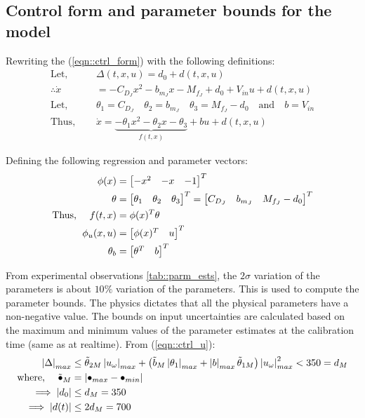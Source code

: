 \subsection{Control form and parameter bounds for the model}

Rewriting the (\ref{eqn::ctrl_form}) with the following definitions:
\begin{align}
    \text{Let, }\quad &\Delta(t, x, u) = d_0 + d(t, x, u) \\
    \therefore \dot x &= -C_{D_J} x^2 -b_{m_J} x - M_{f_J} + d_0 + V_{in} u + d(t, x, u) \\
    \text{Let, } \quad & \theta_1 = C_{D_J} \quad \theta_2 = b_{m_J} \quad \theta_3 = M_{f_J} - d_0  \quad \text{and} \quad b = V_{in}\\
    \text{Thus, }\quad & \dot x = \underbrace{-\theta_1 x^2 -\theta_2 x - \theta_3}_{f(t, x)} + b u + d(t, x, u)
    \label{eqn::prm_ctrl_form}
\end{align}

Defining the following regression and parameter vectors:
\begin{align}
    \phi(x) &= \begin{bmatrix}  -x^2 & -x & -1 \end{bmatrix}^T \\
    \theta &= \begin{bmatrix} \theta_1 & \theta_2 & \theta_3 \end{bmatrix}^T = \begin{bmatrix} C_{D_J} & b_{m_J} & M_{f_J}-d_0 \end{bmatrix}^T \\
    \text{Thus, }\quad f(t, x) &= \phi(x)^T \theta\\
    \phi_u(x, u) &= \begin{bmatrix} \phi(x)^T & u \end{bmatrix}^T \\
    \theta_b &= \begin{bmatrix} \theta^T & b \end{bmatrix}^T
\end{align}

From experimental observations \ref{tab::parm_ests}, the $2\sigma$ variation of
the parameters is about $10\%$ variation of the parameters. This is used to
compute the parameter bounds. The physics dictates that
all the physical parameters have a non-negative value. The bounds on input
uncertainties are calculated based on the maximum and minimum values of the
parameter estimates at the calibration time (same as at realtime). From (\ref{eqn::ctrl_u}):
\begin{align*}
    \left\lvert \Delta \right\rvert_{max} &\leq \tilde \theta_{2M} \left\lvert u_\omega \right\rvert_{max} + \left( \tilde b_M \left\lvert \theta_1 \right\rvert_{max} + \left\lvert b \right\rvert_{max} \tilde \theta_{1M} \right)\left\lvert u_\omega \right\rvert_{max}^2  < 350 = d_M\\
    \text{where, }\quad \tilde \bullet_M &= \left\lvert \bullet_{max} - \bullet_{min} \right\rvert\\
    \implies \left\lvert d_0 \right\rvert &\leq d_M = 350 \\
    \implies \left\lvert d(t) \right\rvert &\leq 2 d_M = 700
\end{align*}



